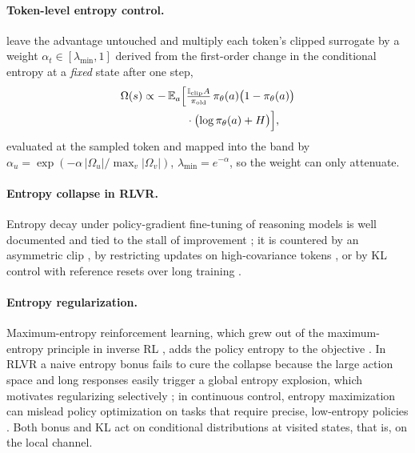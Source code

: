 \documentclass[11pt]{article}
\newcommand{\Om}{\Omega}
\newcommand{\E}{\mathbb{E}}
\newcommand{\pit}{\pi_{\theta}}
\begin{document}
\paragraph{Token-level entropy control.} \citet{steer} leave the advantage untouched
and multiply each token's clipped surrogate by a weight $\alpha_t \in
[\lambda_{\min}, 1]$ derived from the first-order change in the conditional entropy
at a \emph{fixed} state after one step,
\begin{equation}
\begin{split}
\Om(s) \propto -\,\E_{a}\Bigl[&\tfrac{\mathbb{I}_{\mathrm{clip}} A}{\pi_{\mathrm{old}}}\,
  \pit(a)\bigl(1-\pit(a)\bigr)\\
  &\cdot\bigl(\log \pit(a) + H\bigr)\Bigr],
\end{split}
\label{eq:omega}
\end{equation}
evaluated at the sampled token and mapped into the band by $\alpha_u =
\exp(-\alpha\,|\Om_u| / \max_v |\Om_v|)$, $\lambda_{\min} = e^{-\alpha}$, so the
weight can only attenuate.

\paragraph{Entropy collapse in RLVR.} Entropy decay under policy-gradient fine-tuning
of reasoning models is well documented and tied to the stall of improvement
\citep{cui2025bentropy}; it is countered by an asymmetric clip
\citep{yu2025dapo}, by restricting updates on high-covariance tokens
\citep{cui2025bentropy}, or by KL control with reference resets over long training
\citep{liu2025bprorl}.

\paragraph{Entropy regularization.} Maximum-entropy reinforcement learning, which grew
out of the maximum-entropy principle in inverse RL \citep{ziebart2008maximum}, adds the
policy entropy to the objective \citep{haarnoja2018soft}. In RLVR a naive entropy bonus
fails to cure the collapse because the large action space and long responses easily
trigger a global entropy explosion, which motivates regularizing selectively
\citep{rethinkingentropyreg}; in continuous control, entropy maximization can mislead
policy optimization on tasks that require precise, low-entropy policies
\citep{zhang2025cwhen}. Both bonus and KL act on conditional distributions at visited
states, that is, on the local channel.
\end{document}
